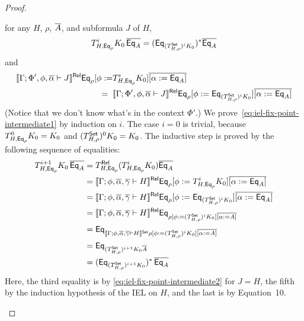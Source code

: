 \documentclass[acmsmall,review,anonymous]{acmart}
\theoremstyle{definition}
\begin{document}
\begin{proof}
\begin{itemize}
for any $H$, $\rho$, $\overline{A}$, and subformula $J$ of $H$,
\begin{equation}\label{eq:iel-fix-point-intermediate1}
T^i_{H, \mathsf{Eq}_{\rho}} K_0\, \overline{\mathsf{Eq}_A} = (\mathsf{Eq}_{(T^{\mathsf{Set}}_{H, \rho})^i K_0})^*
\overline{\mathsf{Eq}_A}
\end{equation}
and 
\begin{equation}\label{eq:iel-fix-point-intermediate2}
\begin{split}
  \llbracket{\Gamma; \Phi', \phi, \overline{\alpha} \vdash J}\rrbracket^{\mathsf{Rel}}
\mathsf{Eq}_{\rho} [\phi := 
 & T^i_{H,\mathsf{Eq}_{\rho}} K_0] \overline{[\alpha :=
    \mathsf{Eq}_A]} \\
=\;\; & \llbracket{\Gamma; \Phi', \phi, \overline{\alpha} \vdash J}\rrbracket^{\mathsf{Rel}} \mathsf{Eq}_{\rho} [\phi
  := \mathsf{Eq}_{(T^{\mathsf{Set}}_{H,\rho})^i K_0}] \overline{[\alpha :=
    \mathsf{Eq}_A]}
\end{split}
\end{equation}
(Notice that we don't know what's in the context $\Phi'$.)  We
prove~\eqref{eq:iel-fix-point-intermediate1} by induction on $i$.  The
case $i=0$ is trivial, because $T^0_{H,\mathsf{Eq}_{\rho}} K_0 = K_0$ and
$(T^{\mathsf{Set}}_{H,\rho})^0 K_0 = K_0$. The inductive step
is proved by the following sequence of equalities:
\[
\begin{split}
T^{i+1}_{H,\mathsf{Eq}_{\rho}} K_0\, \overline{\mathsf{Eq}_A}
&= T^{\mathsf{Rel}}_{H,\mathsf{Eq}_{\rho}} (T^i_{H,\mathsf{Eq}_{\rho}} K_0)
\overline{\mathsf{Eq}_A} \\ 
&= \llbracket{\Gamma; \phi, \overline{\alpha}, \overline{\gamma} \vdash H}\rrbracket^{\mathsf{Rel}} \mathsf{Eq}_{\rho} [\phi
  := T^i_{H, \mathsf{Eq}_{\rho}} K_0] \overline{[\alpha :=
    \mathsf{Eq}_A]} \\ 
&= \llbracket{\Gamma; \phi, \overline{\alpha}, \overline{\gamma} \vdash H}\rrbracket^{\mathsf{Rel}} \mathsf{Eq}_{\rho} [\phi
  := \mathsf{Eq}_{(T^{\mathsf{Set}}_{H,\rho})^i K_0}] \overline{[\alpha :=
    \mathsf{Eq}_A]} \\ 
&= \llbracket{\Gamma; \phi, \overline{\alpha}, \overline{\gamma} \vdash H}\rrbracket^{\mathsf{Rel}} \mathsf{Eq}_{\rho [\phi
    := (T^{\mathsf{Set}}_{H,\rho})^i K_0] \overline{[\alpha :=
      A]}} \\ 
&= \mathsf{Eq}_{\llbracket{\Gamma; \phi, \overline{\alpha}, \overline{\gamma} \vdash H}\rrbracket^{\mathsf{Set}} \rho [\phi
    := (T^{\mathsf{Set}}_{H,\rho})^i K_0] \overline{[\alpha :=
      A]}} \\ 
&= \mathsf{Eq}_{(T^{\mathsf{Set}}_{H,\rho})^{i+1} K_0 \overline{A}} \\ 
&= (\mathsf{Eq}_{(T^{\mathsf{Set}}_{H,\rho})^{i+1} K_0})^*\, \overline{\mathsf{Eq}_A} 
\end{split}
\]
Here, the third equality is by \eqref{eq:iel-fix-point-intermediate2}
for $J = H$, the fifth by the induction hypothesis of the IEL on $H$,
and the last is by Equation~10.

\end{itemize}
\end{proof}
\end{document}
